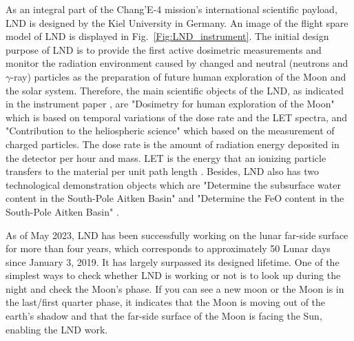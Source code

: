 As an integral part of the Chang'E-4 mission's international scientific payload, \acl{LND} is designed by the Kiel University in Germany. An image of the flight spare model of \ac{LND} is displayed in Fig.~\ref{Fig:LND_instrument}. 
The initial design purpose of \ac{LND} is to provide the first active 
dosimetric measurements and monitor the radiation environment caused by changed and neutral (neutrons and $\gamma$-ray) particles as the preparation of future human exploration of the Moon and the solar system. Therefore, the main scientific objects of the \ac{LND}, as indicated in the instrument paper \citep{Wimmer2020SSRv}, are "Dosimetry for human exploration of the Moon" which is based on temporal variations of the dose rate and the \ac{LET} spectra, and "Contribution to the heliospheric science" which based on the measurement of charged particles. The dose rate is the amount of radiation energy deposited in the detector per hour and mass. \ac{LET} is the energy that an ionizing particle transfers to the material per unit path length \citep{Xu2022FrASS}.
Besides, \ac{LND} also has two technological demonstration objects which are "Determine the subsurface water content in the South-Pole Aitken Basin" and "Determine the FeO content in the South-Pole Aitken Basin" \citep{Wimmer2020SSRv}.

As of May 2023, \ac{LND} has been successfully working on the lunar far-side surface for more than four years, which corresponds to approximately 50 Lunar days since January 3, 2019. It has largely surpassed its designed lifetime.
One of the simplest ways to check whether LND is working or not is to look up during the night and check the Moon's phase. If you can see a new moon or the Moon is in the last/first quarter phase, it indicates that the Moon is moving out of the earth's shadow and that the far-side surface of the Moon is facing the Sun, enabling the \ac{LND} work.

